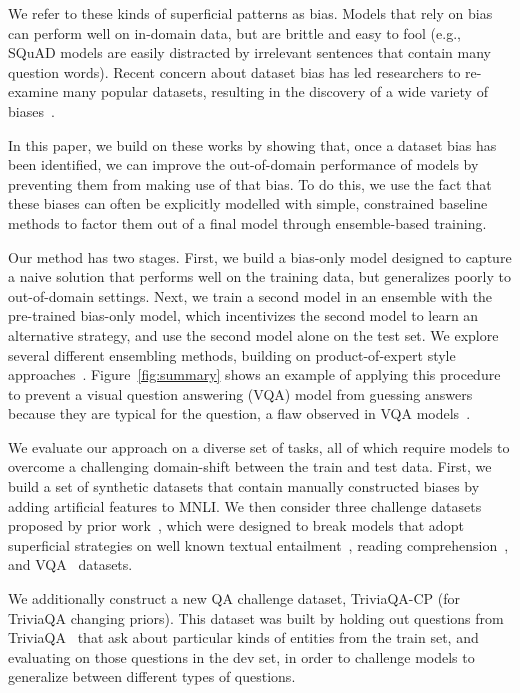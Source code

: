 \documentclass[11pt,a4paper]{article}
\begin{document}
We refer to these kinds of superficial patterns as  bias.
Models that rely on bias can perform well on in-domain data, but are brittle and easy to fool (e.g., SQuAD models are easily distracted by irrelevant sentences that contain many question words). 
Recent concern about dataset bias has led researchers to re-examine many popular datasets, resulting in the discovery of a wide variety of biases~\cite{vqa_cp,anand2018blindfold,min2019compositional,schwartz2017effect}.  

In this paper, we build on these works by showing that, once a dataset bias has been identified, we can improve the out-of-domain performance of models by preventing them from making use of that bias.
To do this, we use the fact that these biases can often be explicitly modelled with simple, constrained baseline methods to factor them out of a final model through ensemble-based training.



Our method has two stages. First, we build a bias-only model designed to capture a naive solution that performs well on the training data, but generalizes poorly to out-of-domain settings. 
Next, we train a second model in an ensemble with the pre-trained bias-only model, which incentivizes the second model to learn an alternative strategy, and use the second model alone on the test set.
We explore several different ensembling methods, building on product-of-expert style approaches~\cite{hinton1999products,smith2005logarithmic}.
Figure~\ref{fig:summary} shows an example of applying this procedure to prevent a visual question answering (VQA) model from guessing answers because they are typical for the question, a flaw observed in 
VQA models~\cite{vqa2,vqa_cp}.

We evaluate our approach on a diverse set of tasks, all of which require models to overcome a challenging domain-shift between the train and test data.
First, we build a set of synthetic datasets that contain manually constructed biases by adding artificial features to MNLI. 
We then consider three challenge datasets proposed by prior work~\cite{vqa_cp,mccoy2019right,adversarial_squad}, which were designed to break models that adopt superficial strategies on well known textual entailment~\cite{bowman2015large}, reading comprehension~\cite{squad}, and VQA~\cite{vqa1} datasets.


We additionally construct a new QA challenge dataset, TriviaQA-CP (for TriviaQA changing priors). This dataset was built by holding out questions from TriviaQA~\cite{joshi2017triviaqa} that ask about particular kinds of entities from the train set, and evaluating on those questions in the dev set, in order to challenge models to generalize between different types of questions.
 
\end{document}

